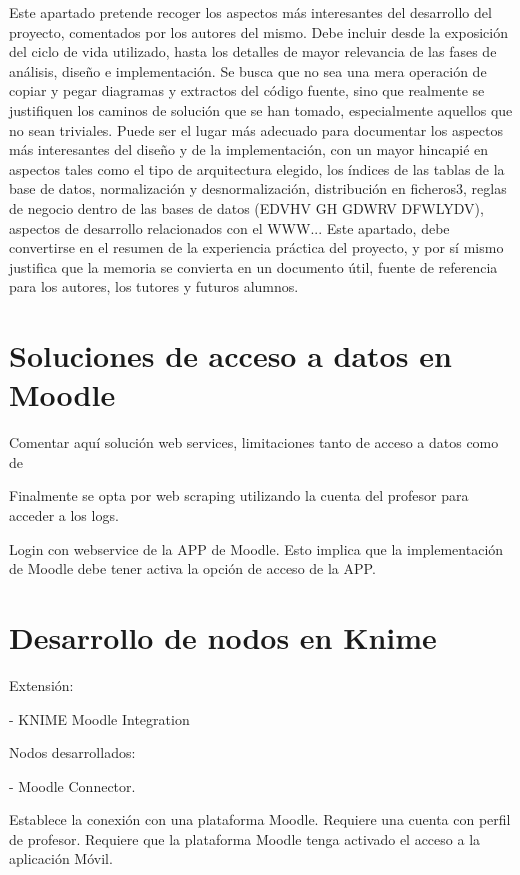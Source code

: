 
Este apartado pretende recoger los aspectos más interesantes del desarrollo del proyecto, comentados por los autores del mismo.
Debe incluir desde la exposición del ciclo de vida utilizado, hasta los detalles de mayor relevancia de las fases de análisis, diseño e implementación.
Se busca que no sea una mera operación de copiar y pegar diagramas y extractos del código fuente, sino que realmente se justifiquen los caminos de solución que se han tomado, especialmente aquellos que no sean triviales.
Puede ser el lugar más adecuado para documentar los aspectos más interesantes del diseño y de la implementación, con un mayor hincapié en aspectos tales como el tipo de arquitectura elegido, los índices de las tablas de la base de datos, normalización y desnormalización, distribución en ficheros3, reglas de negocio dentro de las bases de datos (EDVHV GH GDWRV DFWLYDV), aspectos de desarrollo relacionados con el WWW...
Este apartado, debe convertirse en el resumen de la experiencia práctica del proyecto, y por sí mismo justifica que la memoria se convierta en un documento útil, fuente de referencia para los autores, los tutores y futuros alumnos.



\section{Soluciones de acceso a datos en Moodle}

Comentar aquí solución web services, limitaciones tanto de acceso a datos como de 

Finalmente se opta por web scraping utilizando la cuenta del profesor para acceder a los logs. 

Login con webservice de la APP de Moodle. Esto implica que la implementación de Moodle debe tener activa la opción de acceso de la APP. 



\section{Desarrollo de nodos en Knime}


Extensión: 

- KNIME Moodle Integration


Nodos desarrollados:

- Moodle Connector. 

Establece la conexión con una plataforma Moodle. Requiere una cuenta con perfil de profesor. 
Requiere que la plataforma Moodle tenga activado el acceso a la aplicación Móvil. 

